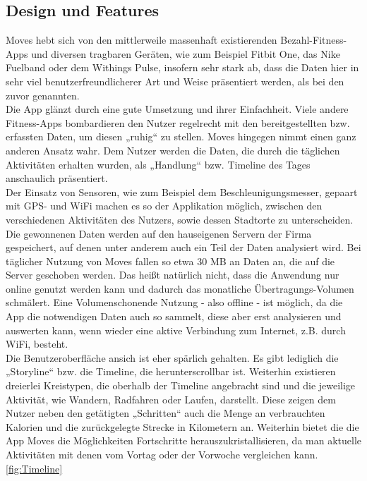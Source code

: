 \subsection{Design und Features}
\label{ch:Apps:sec:Moves:subsec:DuF}

Moves hebt sich von den mittlerweile massenhaft existierenden Bezahl-Fitness-Apps und diversen tragbaren Geräten, wie zum Beispiel Fitbit One, das Nike Fuelband oder dem Withings Pulse, insofern sehr stark ab, dass die Daten hier in sehr viel benutzerfreundlicherer Art und Weise präsentiert werden, als bei den zuvor genannten.
\\
Die App glänzt durch eine gute Umsetzung und ihrer Einfachheit. 
Viele andere Fitness-Apps bombardieren den Nutzer regelrecht mit den bereitgestellten bzw. erfassten Daten, um diesen „ruhig“ zu stellen. 
Moves hingegen nimmt einen ganz anderen Ansatz wahr. 
Dem Nutzer werden die Daten, die durch die täglichen Aktivitäten erhalten wurden, als „Handlung“ bzw. Timeline des Tages anschaulich präsentiert.
\\
Der Einsatz von Sensoren, wie zum Beispiel dem Beschleunigungsmesser, gepaart mit GPS- und WiFi machen es so der Applikation möglich, zwischen den verschiedenen Aktivitäten des Nutzers, sowie dessen Stadtorte zu unterscheiden. 
Die gewonnenen Daten werden auf den hauseigenen Servern der Firma gespeichert, auf denen unter anderem auch ein Teil der Daten analysiert wird. 
Bei täglicher Nutzung von Moves fallen so etwa 30 MB an Daten an, die auf die Server geschoben werden. 
Das heißt natürlich nicht, dass die Anwendung nur online genutzt werden kann und dadurch das monatliche Übertragungs-Volumen schmälert. 
Eine Volumenschonende Nutzung - also offline - ist möglich, da die App die notwendigen Daten auch so sammelt, diese aber erst analysieren und auswerten kann, wenn wieder eine aktive Verbindung zum Internet, z.B. durch WiFi, besteht.   
\\
Die Benutzeroberfläche ansich ist eher spärlich gehalten. 
Es gibt lediglich die „Storyline“ bzw. die Timeline, die herunterscrollbar ist. 
Weiterhin existieren dreierlei Kreistypen, die oberhalb der Timeline angebracht sind und die jeweilige Aktivität, wie Wandern, Radfahren oder Laufen, darstellt. 
Diese zeigen dem Nutzer neben den getätigten „Schritten“ auch die Menge an verbrauchten Kalorien und die zurückgelegte Strecke in Kilometern an. 
Weiterhin bietet die die App Moves die Möglichkeiten Fortschritte herauszukristallisieren, da man aktuelle Aktivitäten mit denen vom Vortag oder der Vorwoche vergleichen kann.   
\\
\ref{fig:Timeline}

